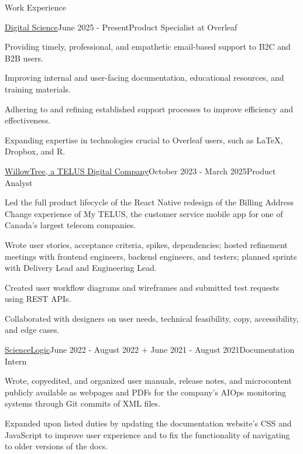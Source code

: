 \documentclass[11pt]{resume} %
\begin{document}
\begin{rSection}{Work Experience}

	\begin{rSubsection}{\href{https://www.digital-science.com/}{Digital Science}}{June 2025 - Present}{Product Specialist at Overleaf}{}\small
		\item Providing timely, professional, and empathetic email-based support to B2C and B2B users.
		\item Improving internal and user-facing documentation, educational resources, and training materials.
		\item Adhering to and refining established support processes to improve efficiency and effectiveness.
		\item Expanding expertise in technologies crucial to Overleaf users, such as \LaTeX, Dropbox, and R.
	\end{rSubsection}


	\begin{rSubsection}{\href{https://www.willowtreeapps.com/}{WillowTree, a TELUS Digital Company}}{October 2023 - March 2025}{Product Analyst}{}\small
		\item Led the full product lifecycle of the React Native redesign of the Billing Address Change experience of My TELUS, the customer service mobile app for one of Canada’s largest telecom companies.
		\item Wrote user stories, acceptance criteria, spikes, dependencies; hosted refinement meetings with frontend engineers, backend engineers, and testers; planned sprints with Delivery Lead and Engineering Lead.
		\item Created user workflow diagrams and wireframes and submitted test requests using REST APIs.
            \item Collaborated with designers on user needs, technical feasibility, copy, accessibility, and edge cases.
	\end{rSubsection}


	\begin{rSubsection}{\href{https://sciencelogic.com/}{ScienceLogic}}{June 2022 - August 2022 + June 2021 - August 2021}{Documentation Intern}{}\small
		\item Wrote, copyedited, and organized user manuals, release notes, and microcontent publicly available as webpages and PDFs for the company's AIOps monitoring systems through Git commits of XML files.
		\item Expanded upon listed duties by updating the documentation website’s CSS and JavaScript to improve user experience and to fix the functionality of navigating to older versions of the docs.
	\end{rSubsection}


\end{rSection}
\end{document}
